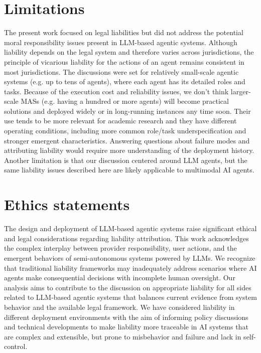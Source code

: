 \documentclass[11pt]{article}
\begin{document}
\section*{Limitations}

The present work focused on legal liabilities but did not address the potential moral responsibility issues present in LLM-based agentic systems. Although liability depends on the legal system and therefore varies across jurisdictions, the principle of vicarious liability for the actions of an agent remains consistent in most jurisdictions. The discussions were set for relatively small-scale agentic systems (e.g. up to tens of agents), where each agent has its detailed roles and tasks. Because of the execution cost and reliability issues, we don't think larger-scale MASs (e.g. having a hundred or more agents) will become practical solutions and deployed widely or in long-running instances any time soon. Their use tends to be more relevant for academic research and they have different operating conditions, including more common role/task underspecification and stronger emergent characteristics. Answering questions about failure modes and attributing liability would require more understanding of the deployment history. Another limitation is that our discussion centered around LLM agents, but the same liability issues described here are likely applicable to multimodal AI agents.

\section*{Ethics statements}

The design and deployment of LLM-based agentic systems raise significant ethical and legal considerations regarding liability attribution. This work acknowledges the complex interplay between provider responsibility, user actions, and the emergent behaviors of semi-autonomous systems powered by LLMs. We recognize that traditional liability frameworks may inadequately address scenarios where AI agents make consequential decisions with incomplete human oversight. Our analysis aims to contribute to the discussion on appropriate liability for all sides related to LLM-based agentic systems that balances current evidence from system behavior and the available legal framework. We have considered liability in different deployment environments with the aim of informing policy discussions and technical developments to make liability more traceable in AI systems that are complex and extensible, but prone to misbehavior and failure and lack in self-control.
\end{document}
